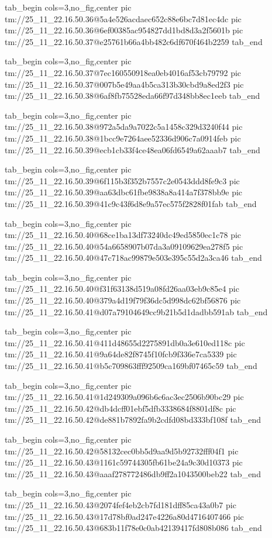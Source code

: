\ifcmt
  tab_begin cols=3,no_fig,center
    pic tm://25_11_22.16.50.36@5a4e526acdaec652c88e6bc7d81ec4dc
    pic tm://25_11_22.16.50.36@6ef00385ac954827dd1bd8d3a2f5601b
    pic tm://25_11_22.16.50.37@e25761b66a4bb482c6df670f464b2259
  tab_end
\fi


\ifcmt
  tab_begin cols=3,no_fig,center
    pic tm://25_11_22.16.50.37@7ec160550918ea0eb4016af53cb79792
    pic tm://25_11_22.16.50.37@007b5e49aa4b5ca313b30cbd9a8ed2f3
    pic tm://25_11_22.16.50.38@6af8fb75528eda66f97d348bb8ec1eeb
  tab_end
\fi


\ifcmt
  tab_begin cols=3,no_fig,center
    pic tm://25_11_22.16.50.38@972a5da9a7022c5a1458c329d3240f44
    pic tm://25_11_22.16.50.38@1bcc9e7264aee52336d906c7a0914feb
    pic tm://25_11_22.16.50.39@ecb1cb33f4ce48ea06fd6549a62aaab7
  tab_end
\fi


\ifcmt
  tab_begin cols=3,no_fig,center
    pic tm://25_11_22.16.50.39@6f115b3f352b7557c2e0543ddd8fe9c3
    pic tm://25_11_22.16.50.39@aa63dbc61fbe9838a8a414a7f378bb9e
    pic tm://25_11_22.16.50.39@41c9c43f6d8e9a57ec575f2828f01fab
  tab_end
\fi


\ifcmt
  tab_begin cols=3,no_fig,center
    pic tm://25_11_22.16.50.40@68ce1ba13df73240dc49ed5850ec1c78
    pic tm://25_11_22.16.50.40@54a6658907b07da3a09109629ea278f5
    pic tm://25_11_22.16.50.40@47c718ac99879e503e395c55d2a3ca46
  tab_end
\fi


\ifcmt
  tab_begin cols=3,no_fig,center
    pic tm://25_11_22.16.50.40@f31f63138d519a08fd26aa03eb9c85e4
    pic tm://25_11_22.16.50.40@379a4d19f79f36dc5d998dc62bf56876
    pic tm://25_11_22.16.50.41@d07a79104649cc9b21b5d1dadbb591ab
  tab_end
\fi


\ifcmt
  tab_begin cols=3,no_fig,center
    pic tm://25_11_22.16.50.41@411d48655d2275891db0a3e610ed118c
    pic tm://25_11_22.16.50.41@9a64de82f8745f10fcb9f336e7ca5339
    pic tm://25_11_22.16.50.41@b5c709863fff92509ca169bf07465c59
  tab_end
\fi


\ifcmt
  tab_begin cols=3,no_fig,center
    pic tm://25_11_22.16.50.41@1d249309a096b6c6ac3ec2506b90bc29
    pic tm://25_11_22.16.50.42@db4dcff01ebf5dfb3338684f8801df8c
    pic tm://25_11_22.16.50.42@de881b7892fa9b2cdfd08bd333bf108f
  tab_end
\fi


\ifcmt
  tab_begin cols=3,no_fig,center
    pic tm://25_11_22.16.50.42@58132cec0bb5d9aa9d5b92732fff04f1
    pic tm://25_11_22.16.50.43@1161c59744305fb61be24a9c30d10373
    pic tm://25_11_22.16.50.43@aaaf278772486db9ff2a1043500beb22
  tab_end
\fi


\ifcmt
  tab_begin cols=3,no_fig,center
    pic tm://25_11_22.16.50.43@2074fef4eb2cb7fd181dff85ca43a0b7
    pic tm://25_11_22.16.50.43@17d78bf0ad247e4226a80d4716407466
    pic tm://25_11_22.16.50.43@683b11f78e0c0ab42139417fd808b086
  tab_end
\fi


